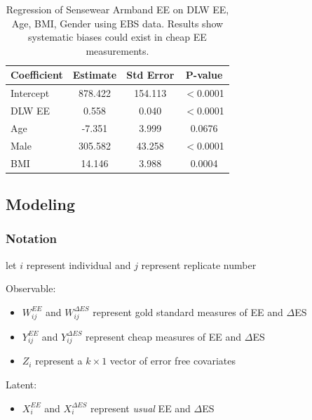 \documentclass[handout]{beamer}\usepackage[]{graphicx}\usepackage[]{color}
\begin{document}
\begin{frame}

\begin{table} \centering 
  \caption{Regression of Sensewear Armband EE on DLW EE, Age, BMI, Gender using EBS data. Results show systematic biases could exist in cheap EE measurements.} 
\begin{tabular}{l|ccc}
\hline
Coefficient & Estimate & Std Error & P-value \\
\hline
Intercept & 878.422 & 154.113 & $<$0.0001 \\
DLW EE & 0.558 & 0.040 & $<$0.0001 \\
Age & -7.351 & 3.999 & 0.0676 \\
Male & 305.582 & 43.258 & $<$0.0001 \\
BMI & 14.146 & 3.988 & 0.0004 \\
\hline
\end{tabular} 
\end{table} 
\end{frame}


\subsection{Modeling}

\begin{frame}
\frametitle{Notation}
let $i$ represent individual and $j$ represent replicate number \\

\vspace{0.3cm}

Observable:
\begin{itemize}
\item
$W_{ij}^{EE}$ and $W_{ij}^{\Delta ES}$ represent gold standard measures of EE and $\Delta$ES
\item
$Y_{ij}^{EE}$ and $Y_{ij}^{\Delta ES}$ represent cheap measures of EE and $\Delta$ES
\item
$Z_i$ represent a $k\times 1$ vector of error free covariates
\end{itemize}

\vspace{0.2cm}

Latent:
\begin{itemize}
\item
$X_{i}^{EE}$ and $X_{i}^{\Delta ES}$ represent \emph{usual} EE and $\Delta$ES

\end{itemize}

\end{frame}
\end{document}

